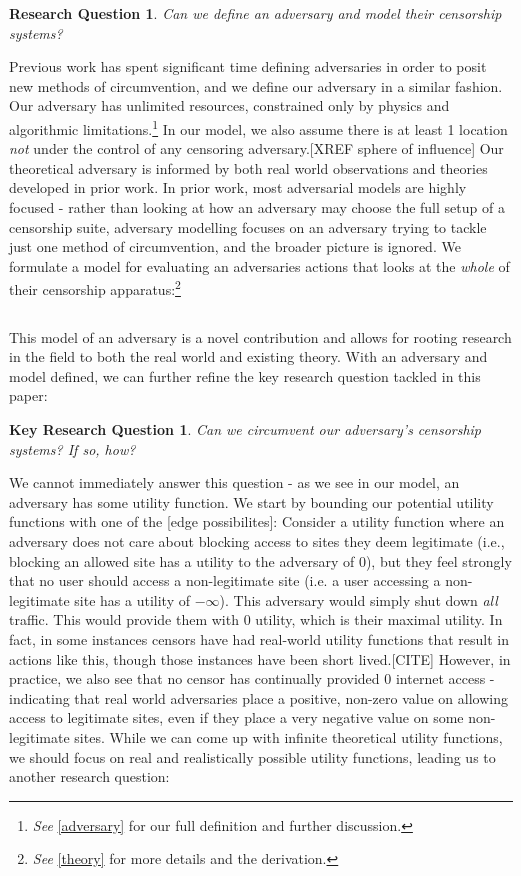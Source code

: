 \documentclass[12pt]{report}
\newtheorem{question}{Research Question}
\newtheorem*{keyq}{Key Research Question}
\begin{document}
\begin{question}
Can we define an adversary and model their censorship systems?
\end{question}

Previous work has spent significant time defining adversaries in order to posit new methods of circumvention, and we define our adversary in a similar fashion. Our adversary has unlimited resources, constrained only by physics and algorithmic limitations.\footnote{\emph{See} \ref{adversary} for our full definition and further discussion.} In our model, we also assume there is at least 1 location \emph{not} under the control of any censoring adversary.[XREF sphere of influence] Our theoretical adversary is informed by both real world observations and theories developed in prior work. In prior work, most adversarial models are highly focused - rather than looking at how an adversary may choose the full setup of a censorship suite, adversary modelling focuses on an adversary trying to tackle just one method of circumvention, and the broader picture is ignored. We formulate a model for evaluating an adversaries actions that looks at the \emph{whole} of their censorship apparatus:\footnote{\emph{See} \ref{theory} for more details and the derivation.}

\begin{equation}
[TODO: insert the final equation after cleaning notation]
\end{equation}

This model of an adversary is a novel contribution and allows for rooting research in the field to both the real world and existing theory. With an adversary and model defined, we can further refine the key research question tackled in this paper:

\begin{keyq}
Can we circumvent our adversary's censorship systems? If so, how?
\end{keyq}

We cannot immediately answer this question - as we see in our model, an adversary has some utility function. We start by bounding our potential utility functions with one of the [edge possibilites]: Consider a utility function where an adversary does not care about blocking access to sites they deem legitimate (i.e., blocking an allowed site has a utility to the adversary of $0$), but they feel strongly that no user should access a non-legitimate site (i.e. a user accessing a non-legitimate site has a utility of $-\infty$). This adversary would simply shut down \emph{all} traffic. This would provide them with $0$ utility, which is their maximal utility. In fact, in some instances censors have had real-world utility functions that result in actions like this, though those instances have been short lived.[CITE] However, in practice, we also see that no censor has continually provided 0 internet access - indicating that real world adversaries place a positive, non-zero value on allowing access to legitimate sites, even if they place a very negative value on some non-legitimate sites. While we can come up with infinite theoretical utility functions, we should focus on real and realistically possible utility functions, leading us to another research question:
\end{document}
